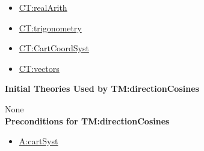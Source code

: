\documentclass[12pt]{article}
\begin{document}
\begin{itemize}
\item \hyperref[CT:realArith]{CT:realArith}
\item \hyperref[CT:trigonometry]{CT:trigonometry}
\item \hyperref[CT:CartCoordSyst]{CT:CartCoordSyst}
\item \hyperref[CT:vectors]{CT:vectors}
\end{itemize}

\noindent \textbf{Initial Theories Used by TM:directionCosines}

None
~\\

\noindent \textbf{Preconditions for TM:directionCosines}

\begin{itemize}
\item \hyperref[cartSyst]{A:cartSyst}
\end{itemize}
\end{document}
